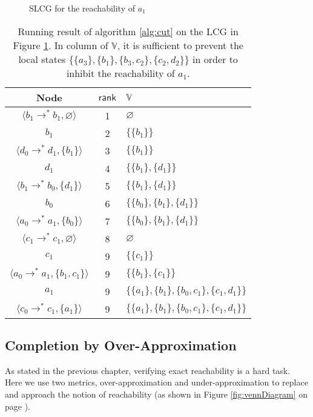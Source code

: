 \begin{figure}[ht]
\centering

\caption{SLCG for the reachability of $a_1$}\label{fig:cut}
\end{figure}

\begin{table}[ht]
\centering
\begin{tabular}{|c|c|l|}
 \hline 
 Node & $\mathsf{rank}$ & $\mathbb{V}$ \\ 
 \hline 
 $\langle b_1\to^*b_1,\varnothing\rangle$ & 1 & $\varnothing$ \\ 
 \hline 
 $b_1$ & 2 & $\{\{b_1\}\}$ \\ 
 \hline 
 $\langle d_0\to^*d_1,\{b_1\}\rangle$ & 3 & $\{\{b_1\}\}$ \\ 
 \hline 
 $d_1$ & 4 & $\{\{b_1\},\{d_1\}\}$ \\ 
 \hline 
 $\langle b_1\to^*b_0,\{d_1\}\rangle$ & 5 & $\{\{b_1\},\{d_1\}\}$ \\ 
 \hline 
 $b_0$ & 6 & $\{\{b_0\},\{b_1\},\{d_1\}\}$ \\ 
 \hline 
 $\langle a_0\to^*a_1,\{b_0\}\rangle$ & 7 & $\{\{b_0\},\{b_1\},\{d_1\}\}$ \\ 
 \hline 
 $\langle c_1\to^*c_1,\varnothing\rangle$ & 8 & $\varnothing$ \\ 
 \hline 
 $c_1$ & 9 & $\{\{c_1\}\}$ \\ 
 \hline 
 $\langle a_0\to^*a_1,\{b_1,c_1\}\rangle$ & 9 & $\{\{b_1\},\{c_1\}\}$ \\ 
 \hline 
 $a_1$ & 9 & $\{\{a_1\},\{b_1\},\{b_0,c_1\},\{c_1,d_1\}\}$ \\ 
 \hline 
 $\langle c_0\to^*c_1,\{a_1\}\rangle$ & 9 & $\{\{a_1\},\{b_1\},\{b_0,c_1\},\{c_1,d_1\}\}$ \\ 
 \hline 
 \end{tabular}
 \caption[Example of cut set]{Running result of algorithm \ref{alg:cut} on the LCG in Figure \ref{fig:cut}.
 In column of $\mathbb{V}$, it is sufficient to prevent the local states $\{\{a_3\},\{b_1\},\{b_3,c_2\},\{c_2,d_2\}\}$ in order to inhibit the reachability of $a_1$.}\label{tab:cutset}
\end{table}

\subsection{Completion by Over-Approximation}
As stated in the previous chapter, verifying exact reachability is a hard task.
Here we use two metrics, over-approximation and under-approximation to replace and approach the notion of reachability (as shown in Figure \ref{fig:vennDiagram} on page \pageref{fig:vennDiagram}).

